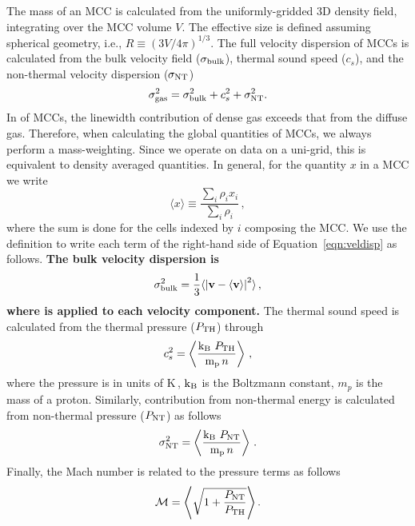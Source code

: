 \IfFileExists{emulateapjlegacy.cls}{\documentclass[iop]{emulateapjlegacy}}{\documentclass[iop]{emulateapj}}
\begin{document}
The mass of an MCC is calculated from the uniformly-gridded 3D density field, integrating over the MCC volume $V$. The effective size is defined assuming spherical geometry, i.e., $R \equiv (3 V /4 \pi)^{1/3}$.
%
The full velocity dispersion of MCCs is calculated from the bulk velocity field ($\sigma_{\rm bulk}$), thermal sound speed ($c_s$), and the non-thermal velocity dispersion ($\sigma_{\rm NT}$)
\begin{equation}
\sigma_{\rm gas}^2 = \sigma_{\rm bulk}^2 + c_s^2 + \sigma_{\rm NT}^2.
\label{eqn:veldisp}
\end{equation}
%
In \obs of MCCs, the linewidth contribution of dense gas exceeds that from the diffuse gas. Therefore, when calculating the global quantities of MCCs, we always perform a mass-weighting. Since we operate on data on a uni-grid, this is equivalent to density averaged quantities. In general, for the quantity $x$ in a MCC we write
\begin{equation}\label{eqn:defineaverage}
\langle x \rangle \equiv \frac{\sum_{i} \rho_i x_i }{\sum_i \rho_i}\,,
\end{equation}
where the sum is done for the cells indexed by $i$ composing the MCC. 
We use the definition  to write each term of the right-hand side of Equation~\ref{eqn:veldisp} as follows.
%
{\bf The bulk velocity dispersion is 
\begin{equation}
\sigma_{\rm bulk}^2 = \frac{1}{{3}} \langle \left|\mathbf{v} - \langle \mathbf{v} \rangle  \right|^2\rangle \,,
\end{equation}
where  is applied to each velocity component.
}
%
The thermal sound speed is calculated from the thermal pressure ($P_{\rm TH}$) through
\begin{equation}
c_s^2 = \left\langle \frac{{\rm k_B} ~P_{\rm TH}}{{\rm m_p}\, n} \right\rangle\,,
\end{equation}
where the pressure is in units of K\,\cc, $\rm k_B$ is the Boltzmann constant, $m_p$ is the mass of a proton. Similarly, contribution from non-thermal energy is calculated from non-thermal pressure ($P_{\rm NT}$) as follows
\begin{equation}
\sigma_{\rm NT}^2 = \left\langle \frac{{\rm k_B} ~P_{\rm NT}}{{\rm m_p}\, n}\right\rangle\,.
\end{equation}
%
Finally, the Mach number is related to the pressure terms as follows
\begin{equation}
\mathcal{M} = \left\langle \sqrt{ 1 + \frac{P_{\rm NT}}{P_{\rm TH}}} \right\rangle.
\label{eqn:MPress}
\end{equation}
\end{document}
